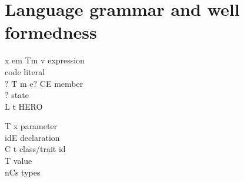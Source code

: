 \section{Language grammar and well formedness}
\begin{minipage}{0.63\textwidth}
\begin{bnf}
      {x \mmid{} em \mmid{}Tm
\mmid{} v
}{expression}\\      {
\mmid{} 
}        {code literal}\\      {$?$ T m e$?$ \mmid{} C\eq{}E }                                                    {member}\\      {$?$}                                          {state}\\      {L \mmid{} t \mmid{}  \mmid{} }           {HERO}%
\end{bnf}
\end{minipage}
\begin{minipage}[t]{0.5\textwidth}
\begin{bnf}
     {T x}                                                              {parameter}\\      {id\eq{}E}                                                         {declaration}\\     {C \mmid{} t}                                                      {class/trait id}\\      { T}                                                 {value}\\      {nCs}                                                 {types}
\end{bnf}
\end{minipage}


